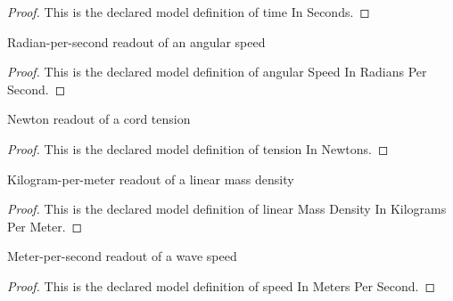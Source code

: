 \begin{proof}
  This is the declared model definition of time In Seconds.
\end{proof}
\begin{definition}
  \label{def:physics:phyx-mini-0243:phyxminiproblems-problemphyxmini0243-angularspeedinradianspersecond}
  Radian-per-second readout of an angular speed
\end{definition}
\begin{proof}
  This is the declared model definition of angular Speed In Radians Per Second.
\end{proof}
\begin{definition}
  \label{def:physics:phyx-mini-0243:phyxminiproblems-problemphyxmini0243-tensioninnewtons}
  Newton readout of a cord tension
\end{definition}
\begin{proof}
  This is the declared model definition of tension In Newtons.
\end{proof}
\begin{definition}
  \label{def:physics:phyx-mini-0243:phyxminiproblems-problemphyxmini0243-linearmassdensityinkilogramspermeter}
  Kilogram-per-meter readout of a linear mass density
\end{definition}
\begin{proof}
  This is the declared model definition of linear Mass Density In Kilograms Per Meter.
\end{proof}
\begin{definition}
  \label{def:physics:phyx-mini-0243:phyxminiproblems-problemphyxmini0243-speedinmeterspersecond}
  Meter-per-second readout of a wave speed
\end{definition}
\begin{proof}
  This is the declared model definition of speed In Meters Per Second.
\end{proof}
